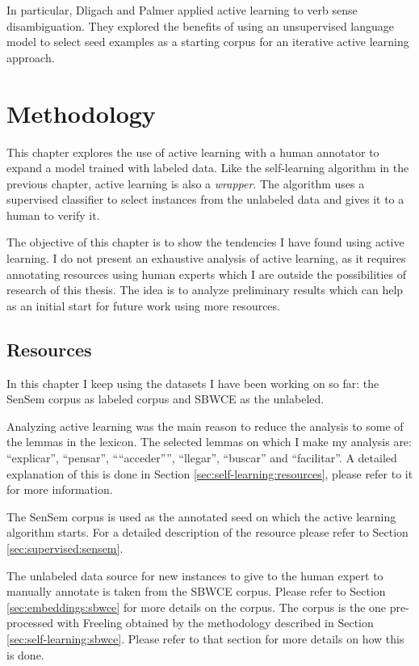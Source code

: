 In particular, Dligach and Palmer \cite{dligach2011good} applied active
learning to verb sense disambiguation. They explored the benefits of using an
unsupervised language model to select seed examples as a starting corpus for an
iterative active learning approach.

\section{Methodology}\label{sec:active:methodology}

This chapter explores the use of active learning with a human annotator to
expand a model trained with labeled data. Like the self-learning algorithm in
the previous chapter, active learning is also a {\em wrapper}. The algorithm
uses a supervised classifier to select instances from the unlabeled data and
gives it to a human to verify it.

The objective of this chapter is to show the tendencies I have found using
active learning. I do not present an exhaustive analysis of active learning, as
it requires annotating resources using human experts which I are outside the
possibilities of research of this thesis. The idea is to analyze preliminary
results which can help as an initial start for future work using more
resources.

\subsection{Resources}\label{sec:active:resources}

In this chapter I keep using the datasets I have been working on so far: the
SenSem corpus as labeled corpus and SBWCE as the unlabeled.

Analyzing active learning was the main reason to reduce the analysis to some of
the lemmas in the lexicon. The selected lemmas on which I make my analysis are:
``explicar'', ``pensar'', ````acceder'''', ``llegar'', ``buscar'' and
``facilitar''. A detailed explanation of this is done in Section
\ref{sec:self-learning:resources}, please refer to it for more information.

The SenSem corpus is used as the annotated seed on which the active learning
algorithm starts. For a detailed description of the resource please refer to
Section \ref{sec:supervised:sensem}.

The unlabeled data source for new instances to give to the human expert to
manually annotate is taken from the SBWCE corpus. Please refer to Section
\ref{sec:embeddings:sbwce} for more details on the corpus. The corpus is the
one pre-processed with Freeling obtained by the methodology described in
Section \ref{sec:self-learning:sbwce}. Please refer to that section for more
details on how this is done.

